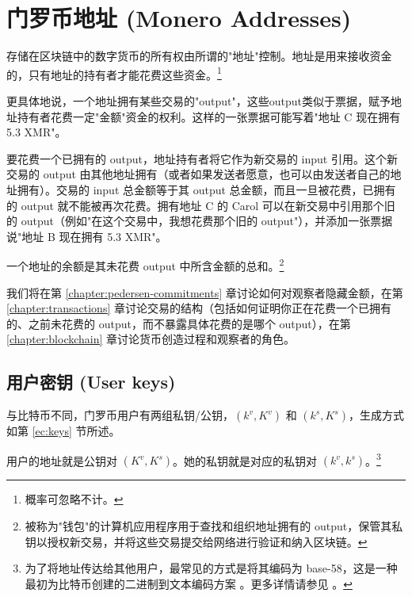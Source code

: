 \chapter{门罗币地址 (Monero Addresses)}
\label{chapter:addresses}

存储在区块链中的数字货币的所有权由所谓的"地址"控制。地址是用来接收资金的，只有地址的持有者才能花费这些资金。\footnote{概率可忽略不计。}

更具体地说，一个地址拥有某些交易的"output"，这些output类似于票据，赋予地址持有者花费一定"金额"资金的权利。这样的一张票据可能写着"地址 C 现在拥有 5.3 XMR"。

要花费一个已拥有的 output，地址持有者将它作为新交易的 input 引用。这个新交易的 output 由其他地址拥有（或者如果发送者愿意，也可以由发送者自己的地址拥有）。交易的 input 总金额等于其 output 总金额，而且一旦被花费，已拥有的 output 就不能被再次花费。拥有地址 C 的 Carol 可以在新交易中引用那个旧的 output（例如"在这个交易中，我想花费那个旧的 output"），并添加一张票据说"地址 B 现在拥有 5.3 XMR"。

一个地址的余额是其未花费 output 中所含金额的总和。\footnote{被称为"钱包"的计算机应用程序用于查找和组织地址拥有的 output，保管其私钥以授权新交易，并将这些交易提交给网络进行验证和纳入区块链。}

我们将在第 \ref{chapter:pedersen-commitments} 章讨论如何对观察者隐藏金额，在第 \ref{chapter:transactions} 章讨论交易的结构（包括如何证明你正在花费一个已拥有的、之前未花费的 output，而不暴露具体花费的是哪个 output），在第 \ref{chapter:blockchain} 章讨论货币创造过程和观察者的角色。



\section{用户密钥 (User keys)}
\label{sec:user-keys}

与比特币不同，门罗币用户有两组私钥/公钥，\((k^v, K^v)\) 和 \( (k^s, K^s) \)，生成方式如第 \ref{ec:keys} 节所述。

用户的{地址}就是公钥对 \((K^v, K^s)\)。她的私钥就是对应的私钥对 \( (k^v, k^s) \)。\footnote{为了将地址传达给其他用户，最常见的方式是将其编码为 base-58，这是一种最初为比特币创建的二进制到文本编码方案 \cite{base-58-encoding}。更多详情请参见 \cite{luigi-address}。}\\

